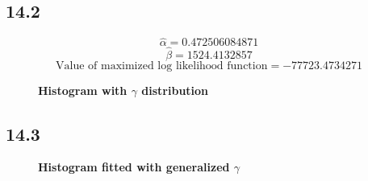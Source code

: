 \documentclass[letterpaper,12pt]{article}
\theoremstyle{definition}
\begin{document}
\subsection*{14.2}


\[\hat{\alpha} =  0.472506084871\]
\[\hat{\beta} =  1524.4132857\]
\[ \text{Value of maximized log likelihood function} = -77723.4734271\]

\begin{figure}[htb]\centering \captionsetup{width=4.0in}  
        \caption{\label{Histogram<800}\textbf{Histogram with $\gamma$ distribution}}
\end{figure}

\newpage



\subsection*{14.3}


\begin{figure}[htb]\centering \captionsetup{width=4.0in}
        \caption{\label{Histogram<800}\textbf{Histogram fitted with generalized $\gamma$}}
\end{figure}
\end{document}

